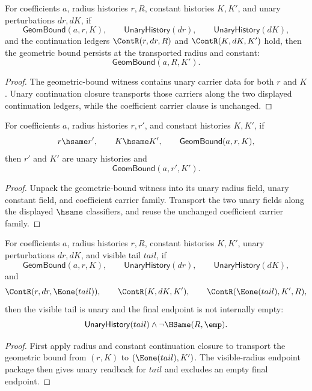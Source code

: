 \begin{lemma}
\label{lem:geom-bound-radius-constant-continuation-closed}
For coefficients $a$, radius histories $r,R$, constant histories $K,K'$, and
unary perturbations $dr,dK$, if
$$
\mathsf{GeomBound}(a,r,K),\qquad
\mathsf{UnaryHistory}(dr),\qquad
\mathsf{UnaryHistory}(dK),
$$
and the continuation ledgers $\ContR(r,dr,R)$ and $\ContR(K,dK,K')$ hold,
then the geometric bound persists at the transported radius and constant:
$$
\mathsf{GeomBound}(a,R,K').
$$
\end{lemma}
\begin{proof}
The geometric-bound witness contains unary carrier data for both $r$ and $K$.
Unary continuation closure transports those carriers along the two displayed
continuation ledgers, while the coefficient carrier clause is unchanged.
\end{proof}

\begin{theorem}
\label{thm:geom-bound-radius-constant-hsame-transport-unary}
For coefficients $a$, radius histories $r,r'$, and constant histories $K,K'$,
if
$$
r\hsame r',
\qquad
K\hsame K',
\qquad
\mathsf{GeomBound}(a,r,K),
$$
then $r'$ and $K'$ are unary histories and
$$
\mathsf{GeomBound}(a,r',K').
$$
\end{theorem}
\begin{proof}
Unpack the geometric-bound witness into its unary radius field, unary constant
field, and coefficient carrier family. Transport the two unary fields along
the displayed $\hsame$ classifiers, and reuse the unchanged coefficient
carrier family.
\end{proof}

\begin{theorem}
\label{thm:geom-bound-continuation-visible-radius-endpoint-package}
For coefficients $a$, radius histories $r,R$, constant histories $K,K'$,
unary perturbations $dr,dK$, and visible tail $tail$, if
$$
\mathsf{GeomBound}(a,r,K),\qquad
\mathsf{UnaryHistory}(dr),\qquad
\mathsf{UnaryHistory}(dK),
$$
and
$$
\ContR(r,dr,\Eone(tail)),\qquad
\ContR(K,dK,K'),\qquad
\ContR(\Eone(tail),K',R),
$$
then the visible tail is unary and the final endpoint is not internally empty:
$$
\mathsf{UnaryHistory}(tail)\land \neg\HSame(R,\emp).
$$
\end{theorem}
\begin{proof}
First apply radius and constant continuation closure to transport the geometric
bound from $(r,K)$ to $(\Eone(tail),K')$. The visible-radius endpoint package
then gives unary readback for $tail$ and excludes an empty final endpoint.
\end{proof}

